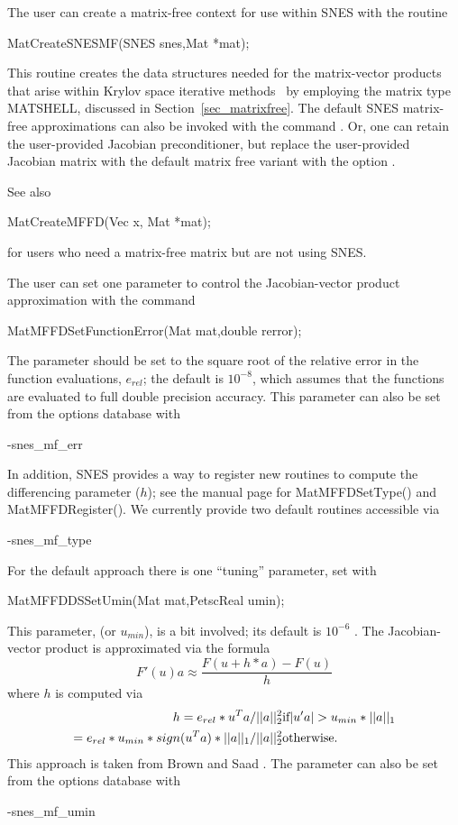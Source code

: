 The user can create a matrix-free context for use within SNES with
the routine
\begin{tabbing}
  MatCreateSNESMF(SNES snes,Mat *mat);
\end{tabbing}
This routine creates the data structures needed for the matrix-vector
products that arise within Krylov space iterative methods~\cite{brownsaad:90}
by employing the matrix type MATSHELL,
discussed in Section~\ref{sec_matrixfree}.  The default SNES matrix-free
approximations can also be invoked with the command . 
Or, one can retain the user-provided Jacobian preconditioner, but replace the
user-provided Jacobian matrix with the default matrix free variant with the
option . 

See also
\begin{tabbing}
  MatCreateMFFD(Vec x, Mat *mat);
\end{tabbing}
for users who need a matrix-free matrix but are not using SNES.

The user can set one parameter to control the Jacobian-vector
product approximation with the command
\begin{tabbing}
  MatMFFDSetFunctionError(Mat mat,double rerror);
\end{tabbing}
The parameter  should be set to the square root of the
relative error in the function evaluations, $e_{rel}$; the default is $ 10^{-8} $,
which assumes that the functions are evaluated to full double precision accuracy.
This parameter can also be set from the options database with
\begin{tabbing}
   -snes\_mf\_err 
\end{tabbing}

In addition, SNES provides a way to register new routines to compute the differencing parameter ($h$);
see the manual page for MatMFFDSetType() and MatMFFDRegister(). We currently provide two default routines accessible via
\begin{tabbing}
  -snes\_mf\_type 
\end{tabbing}
For the default approach there is one ``tuning'' parameter, set with
\begin{tabbing}
  MatMFFDDSSetUmin(Mat mat,PetscReal umin);
\end{tabbing}
This parameter,  (or $u_{min}$), is a bit involved; its default is
$ 10^{-6} $ . The Jacobian-vector product is approximated via the formula
\[
    F'(u) a \approx \frac{F(u + h*a) - F(u)}{h}
\]
where $ h $ is computed via
\begin{eqnarray*}
        h = e_{rel}*u^{T}a/||a||^2_2                       &    \hbox{if}  |u'a| > u_{min}*||a||_{1} \\
          = e_{rel}*u_{min}*sign(u^{T}a)*||a||_{1}/||a||^2_2  &    \hbox{otherwise}.
\end{eqnarray*}
This approach is taken from Brown and Saad \cite{brownsaad:90}.
The parameter can also be set from the options database with
\begin{tabbing}
   -snes\_mf\_umin 
\end{tabbing}


